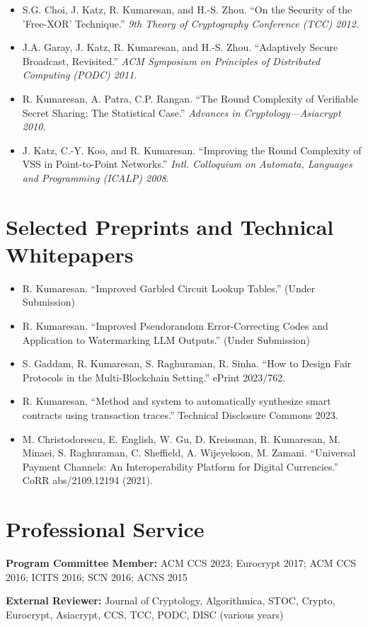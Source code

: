 \documentclass[11pt]{article}
\begin{document}
\begin{itemize}[leftmargin=*, noitemsep, topsep=0pt]
    \item S.G. Choi, J. Katz, R. Kumaresan, and H.-S. Zhou. ``On the Security of the 'Free-XOR' Technique.'' \textit{9th Theory of Cryptography Conference (TCC) 2012}.
    \item J.A. Garay, J. Katz, R. Kumaresan, and H.-S. Zhou. ``Adaptively Secure Broadcast, Revisited.'' \textit{ACM Symposium on Principles of Distributed Computing (PODC) 2011}.
    \item R. Kumaresan, A. Patra, C.P. Rangan. ``The Round Complexity of Verifiable Secret Sharing: The Statistical Case.'' \textit{Advances in Cryptology—Asiacrypt 2010}.
    \item J. Katz, C.-Y. Koo, and R. Kumaresan. ``Improving the Round Complexity of VSS in Point-to-Point Networks.'' \textit{Intl. Colloquium on Automata, Languages and Programming (ICALP) 2008}.
\end{itemize}

\section{Selected Preprints and Technical Whitepapers}
\begin{itemize}[leftmargin=*, noitemsep, topsep=0pt]
    \item R. Kumaresan. ``Improved Garbled Circuit Lookup Tables.'' (Under Submission)
    \item R. Kumaresan. ``Improved Pseudorandom Error-Correcting Codes and Application to Watermarking LLM Outputs.'' (Under Submission)
    \item S. Gaddam, R. Kumaresan, S. Raghuraman, R. Sinha. ``How to Design Fair Protocols in the Multi-Blockchain Setting.'' ePrint 2023/762.
    \item R. Kumaresan. ``Method and system to automatically synthesize smart contracts using transaction traces.'' Technical Disclosure Commons 2023.
    \item M. Christodorescu, E. English, W. Gu, D. Kreissman, R. Kumaresan, M. Minaei, S. Raghuraman, C. Sheffield, A. Wijeyekoon, M. Zamani. ``Universal Payment Channels: An Interoperability Platform for Digital Currencies.'' CoRR abs/2109.12194 (2021).
\end{itemize}

\section{Professional Service}
\textbf{Program Committee Member:} ACM CCS 2023; Eurocrypt 2017; ACM CCS 2016; ICITS 2016; SCN 2016; ACNS 2015

\textbf{External Reviewer:} Journal of Cryptology, Algorithmica, STOC, Crypto, Eurocrypt, Asiacrypt, CCS, TCC, PODC, DISC (various years)
\end{document}
